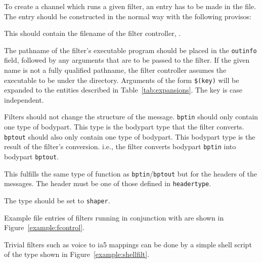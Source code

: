 To create a channel which runs a given filter, an entry has to be made
in the  file.  The entry should be constructed in the normal way
with the following provisos:

\begin{describe}

\item[\verb+prog+:] This should contain the filename of the
filter controller, .

\item[\verb+outinfo+:] 
The pathname of the filter's executable program should be placed in
the \verb+outinfo+ field, followed by any arguments that are to be passed
to the filter.  If the given name is not a fully qualified pathname,
the filter controller assumes the executable to be under the
 directory.  Arguments of the form \verb+$(key)+ will be
expanded to the entities described in Table~\ref{tab:expansions}.  The
key is case independent.

\item[\verb+bptin+/\verb+bptout+] 
Filters should not change the structure of the message. \verb+bptin+
should only contain one type of bodypart.  This type is the bodypart
type that the filter converts. \verb+bptout+ should also only contain
one type of bodypart.  This bodypart type is the result of the
filter's conversion.  i.e., the filter converts bodypart \verb+bptin+
into bodypart
\verb+bptout+.

\item[\verb+hdrin+/\verb+hdrout+]
This fulfills the same type of function as \verb+bptin+/\verb+bptout+
but for the headers of the messages. The header must be one of those
defined in \verb+headertype+.

\item[\verb+type+] The type should be set to \verb|shaper|.

\end{describe}


Example  file entries of filters running in conjunction with
 are shown in Figure~\ref{example:fcontrol}.


Trivial filters such as voice to ia5 mappings can be done by a simple
shell script of the type shown in Figure~\ref{example:shellfilt}.

